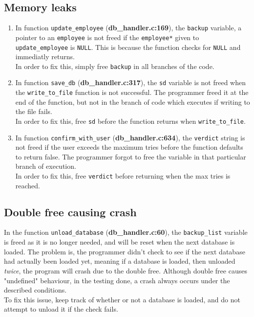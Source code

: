 \documentclass[]{article}
\begin{document}
\vspace*{0.8cm}
\subsection*{Memory leaks}
\begin{enumerate}
	\item In function \texttt{update\_employee} (\textbf{db\_handler.c:169}), the \texttt{backup} variable, a pointer to an \texttt{employee} is not freed if the \texttt{employee*} given to \texttt{update\_employee} is \texttt{NULL}. This is because the function checks for \texttt{NULL} and immediatly returns.
	\\
	In order to fix this, simply free \texttt{backup} in all branches of the code.
	\item In function \texttt{save\_db} (\textbf{db\_handler.c:317}), the \texttt{sd} variable is not freed when the \texttt{write\_to\_file} function is not successful. The programmer freed it at the end of the function, but not in the branch of code which executes if writing to the file fails.
	\\
	In order to fix this, free \texttt{sd} before the function returns when \texttt{write\_to\_file}.
	\item In function \texttt{confirm\_with\_user} (\textbf{db\_handler.c:634}), the \texttt{verdict} string is not freed if the user exceeds the maximum tries before the function defaults to return false. The programmer forgot to free the variable in that particular branch of execution.
	\\
	In order to fix this, free \texttt{verdict} before returning when the max tries is reached.
\end{enumerate}

\subsection*{Double free causing crash}
In the function \texttt{unload\_database} (\textbf{db\_handler.c:60}), the \texttt{backup\_list} variable is freed as it is no longer needed, and will be reset when the next database is loaded. The problem is, the programmer didn't check to see if the next database had actually been loaded yet, meaning if a database is loaded, then unloaded \textit{twice}, the program will crash due to the double free. Although  double free causes "undefined" behaviour, in the testing done, a crash always occurs under the described conditions.
\\
To fix this issue, keep track of whether or not a database is loaded, and do not attempt to unload it if the check fails.
\end{document}
